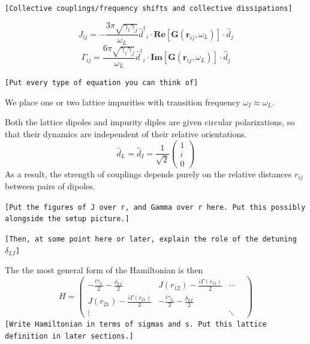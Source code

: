 \documentclass[aps,pra,superscriptaddress,twocolumn]{revtex4-1}
\newcommand{\commentSB}[1]{\texttt{\color{blue}[#1]}}
\newcommand{\commentTP}[1]{\texttt{\color{green}[#1]}}
\begin{document}
    \commentTP{Collective couplings/frequency shifts and collective dissipations}

    $$
        J_{ij} = -\frac{3\pi \sqrt{\gamma_i \gamma_j}}{\omega_L} {\hat{d}^\dagger}_i \cdot \textbf{Re} [\textbf{G}(\textbf{r}_{ij}, \omega_L)] \cdot \hat{d}_j 
        \label{eqn:J}
    $$
    $$
        \Gamma_{ij} = \frac{6\pi \sqrt{\gamma_i \gamma_j}}{\omega_L} {\hat{d}^\dagger}_i \cdot \textbf{Im} [\textbf{G}(\textbf{r}_{ij},\omega_L)] \cdot \hat{d}_j 
        \label{eqn:Gamma}
    $$

    \commentTP{Put every type of equation you can think of}

    We place one or two lattice impurities with transition frequency $\omega_I \approx \omega_L$. 


    Both the lattice dipoles and impurity diples are given circular polarizations, so that their dynamics are independent of their relative orientations.
    \begin{equation} 
        \hat{d}_L = \hat{d}_I = \frac{1}{\sqrt{2}} \begin{pmatrix}
        1 \\ i \\ 0
        \end{pmatrix} 
        \label{eqn:polarization}
    \end{equation}
    As a result, the strength of couplings depends purely on the relative distances $r_{ij}$ between pairs of dipoles. 

    \commentSB{Put the figures of J over r, and Gamma over r here. Put this possibly alongside the setup picture.}

    \commentSB{Then, at some point here or later, explain the role of the detuning $\delta_{LI}$}



    The the most general form of the Hamiltonian is then
    \begin{equation}
        H = 
        \begin{pmatrix}
            -\frac{i \gamma_L}{2} - \frac{\delta_{LI}}{2} & J(r_{12}) - \frac{i \Gamma(r_{12})}{2} & \cdots \\
            J(r_{21}) - \frac{i \Gamma(r_{21})}{2} & -\frac{i \gamma_L}{2} - \frac{\delta_{LI}}{2} & & \\
            \vdots & & \ddots

        \end{pmatrix}
    \end{equation}
    \commentTP{Write Hamiltonian in terms of sigmas and s. Put this lattice definition in later sections.}
\end{document}
